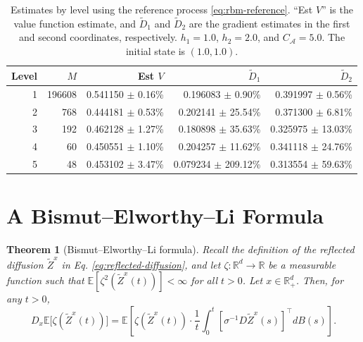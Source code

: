 \documentclass[11pt]{article}
\theoremstyle{definition}
\theoremstyle{plain}
\newtheorem{theorem}[assumption]{Theorem}
\newcommand{\E}{\mathbb{E}}
\begin{document}
\begin{table}[t]
  \centering
  \caption{Estimates by level using the reference process \eqref{eq:rbm-reference}. 
  ``Est $V$'' is the value function estimate, and $\tilde D_1$ and $\tilde D_2$ 
  are the gradient estimates in the first and second coordinates, respectively. 
  $h_1 = 1.0$, $h_2 = 2.0$, and $C_{\mathcal{A}} = 5.0$. The initial state is $(1.0, 1.0)$.} 
  \label{tab:switching-curve-averages-comparison}
  \begin{tabular}{r r r r r}
    \toprule
    Level & $M$ & Est $V$ & $\tilde D_1$ & $\tilde D_2$ \\
    \midrule
    1 & 196608 & 0.541150 $\pm$ 0.16\% & 0.196083 $\pm$ 0.90\% & 0.391997 $\pm$ 0.56\% \\
    2 & 768 & 0.444181 $\pm$ 0.53\% & 0.202141 $\pm$ 25.54\% & 0.371300 $\pm$ 6.81\% \\
    3 & 192 & 0.462128 $\pm$ 1.27\% & 0.180898 $\pm$ 35.63\% & 0.325975 $\pm$ 13.03\% \\
    4 & 60 & 0.450551 $\pm$ 1.10\% & 0.204257 $\pm$ 11.62\% & 0.341118 $\pm$ 24.76\% \\
    5 & 48 & 0.453102 $\pm$ 3.47\% & 0.079234 $\pm$ 209.12\% & 0.313554 $\pm$ 59.63\% \\
    \bottomrule
  \end{tabular}
\end{table}

\section{A Bismut--Elworthy--Li Formula}\label{sec:bel}

\begin{theorem}[Bismut--Elworthy--Li formula]\label{thm:bel}
Recall the definition of the reflected diffusion $\tilde Z^x$ in Eq. \eqref{eq:reflected-diffusion}, 
and let $\zeta : \mathbb{R}^d \to \mathbb{R}$ be a measurable function such that $\E[\zeta^2(\tilde Z^x(t))] < \infty$ for all $t > 0$. Let $x \in \mathbb{R}_+^d$. Then, for any $t > 0$,
\begin{equation}\label{eq:bel-main}
D_x \mathbb{E} \bigl[ \zeta(\tilde Z^x(t)) \bigr]
= \mathbb{E} \left[ \zeta(\tilde Z^x(t)) \cdot \frac{1}{t} \int_0^t \left[\sigma^{-1} D\tilde Z^x(s)\right]^{\top} dB(s) \right].
\end{equation}
\end{theorem}
\end{document}
